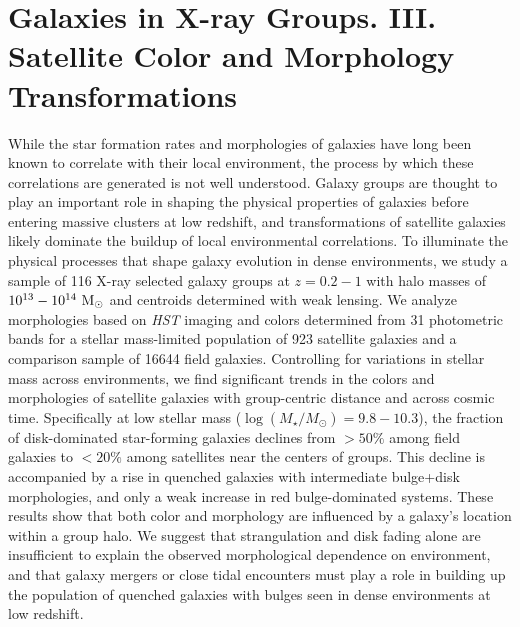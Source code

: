 \chapter{Galaxies in X-ray Groups. III. Satellite Color 
and Morphology Transformations}

\label{chap:transformers}

  
  While the star formation rates and morphologies of galaxies have
  long been known to correlate with their local environment, the
  process by which these correlations are generated is not well
  understood. Galaxy groups are thought to play an important role in
  shaping the physical properties of galaxies before entering massive
  clusters at low redshift, and transformations of satellite galaxies
  likely dominate the buildup of local environmental correlations. To
  illuminate the physical processes that shape galaxy evolution in
  dense environments, we study a sample of 116 X-ray selected galaxy
  groups at $z=0.2-1$ with halo masses of $10^{13}-10^{14}~{\rm
    M_{\odot}}$ and centroids determined with weak lensing. We analyze
  morphologies based on \textit{HST} imaging and colors determined
  from 31 photometric bands for a stellar mass-limited population of
  923 satellite galaxies and a comparison sample of 16644 field
  galaxies. Controlling for variations in stellar mass across
  environments, we find significant trends in the colors and
  morphologies of satellite galaxies with group-centric distance and
  across cosmic time. Specifically at low stellar mass
  ($\log(M_{\star}/M_{\odot}) = 9.8-10.3$), the fraction of
  disk-dominated star-forming galaxies declines from $>50\%$
  among field galaxies to $<20\%$ among satellites near the centers of
  groups. This decline is accompanied by a rise in
  quenched galaxies with intermediate bulge+disk morphologies, and
  only a weak increase in red bulge-dominated systems. These results
  show that both color and morphology are influenced by a galaxy's
  location within a group halo. We suggest that strangulation and disk
  fading alone are insufficient to explain the observed morphological
  dependence on environment, and that galaxy mergers or close tidal
  encounters must play a role in building up the population of
  quenched galaxies with bulges seen in dense environments at low
  redshift.
 

